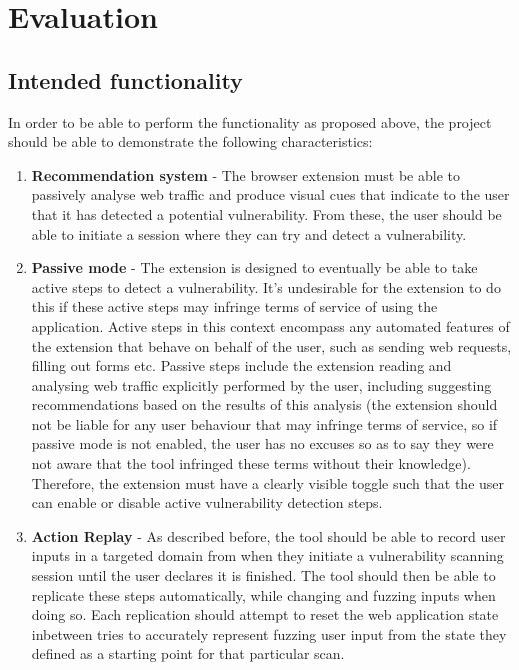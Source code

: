 
\chapter{Evaluation}
	

\section{Intended functionality}
In order to be able to perform the functionality as proposed above, the project should be able to demonstrate the following characteristics:

\begin{enumerate}
	\item \textbf{Recommendation system} - The browser extension must be able to passively analyse web traffic and produce visual cues that indicate to the user that it has detected a potential vulnerability. From these, the user should be able to initiate a session where they can try and detect a vulnerability.
	
	\item \textbf{Passive mode} - The extension is designed to eventually be able to take active steps to detect a vulnerability. It's undesirable for the extension to do this if these active steps may infringe terms of service of using the application. Active steps in this context encompass any automated features of the extension that behave on behalf of the user, such as sending web requests, filling out forms etc. Passive steps include the extension reading and analysing web traffic explicitly performed by the user, including suggesting recommendations based on the results of this analysis (the extension should not be liable for any user behaviour that may infringe terms of service, so if passive mode is not enabled, the user has no excuses so as to say they were not aware that the tool infringed these terms without their knowledge). Therefore, the extension must have a clearly visible toggle such that the user can enable or disable active vulnerability detection steps. 
	
	\item \textbf{Action Replay} - As described before, the tool should be able to record user inputs in a targeted domain from when they initiate a vulnerability scanning session until the user declares it is finished. The tool should then be able to replicate these steps automatically, while changing and fuzzing inputs when doing so. Each replication should attempt to reset the web application state inbetween tries to accurately represent fuzzing user input from the state they defined as a starting point for that particular scan.
	

\end{enumerate}
